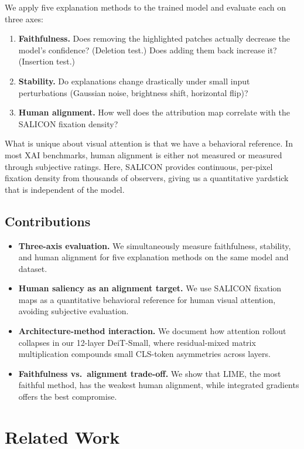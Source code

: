\documentclass{article}
\begin{document}
We apply five explanation methods to the trained model and evaluate each on three axes:
\begin{enumerate}
    \item \textbf{Faithfulness.} Does removing the highlighted patches actually decrease the model's confidence? (Deletion test.) Does adding them back increase it? (Insertion test.)
    \item \textbf{Stability.} Do explanations change drastically under small input perturbations (Gaussian noise, brightness shift, horizontal flip)?
    \item \textbf{Human alignment.} How well does the attribution map correlate with the SALICON fixation density?
\end{enumerate}

What is unique about visual attention is that we have a behavioral reference. In most XAI benchmarks, human alignment is either not measured or measured through subjective ratings. Here, SALICON provides continuous, per-pixel fixation density from thousands of observers, giving us a quantitative yardstick that is independent of the model.

\subsection{Contributions}
\begin{itemize}
    \item \textbf{Three-axis evaluation.} We simultaneously measure faithfulness, stability, and human alignment for five explanation methods on the same model and dataset.
    \item \textbf{Human saliency as an alignment target.} We use SALICON fixation maps as a quantitative behavioral reference for human visual attention, avoiding subjective evaluation.
    \item \textbf{Architecture-method interaction.} We document how attention rollout collapses in our 12-layer DeiT-Small, where residual-mixed matrix multiplication compounds small CLS-token asymmetries across layers.
    \item \textbf{Faithfulness vs.\ alignment trade-off.} We show that LIME, the most faithful method, has the weakest human alignment, while integrated gradients offers the best compromise.
\end{itemize}

\section{Related Work}
\end{document}
